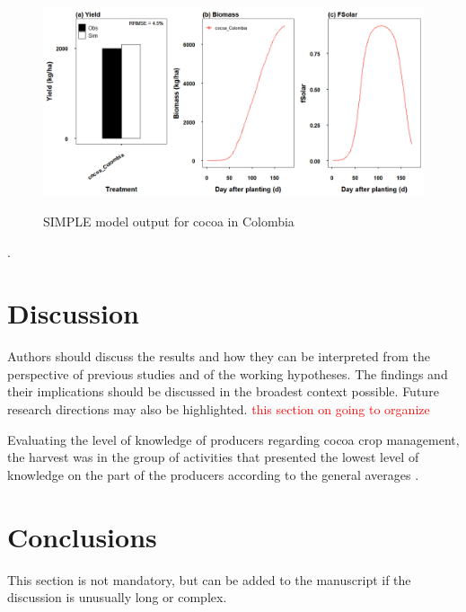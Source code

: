 \documentclass[gene,journal,article,submit,moreauthors,pdftex]{Definitions/mdpi}
\begin{document}
\begin{figure}[h!]
	\centering
	\caption{\footnotesize {SIMPLE model output for cocoa in Colombia }} 
	\includegraphics[scale=0.3]{images/outmodel.png}\\
	\label{fig:m1}
\end{figure}.

\section{Discussion}

Authors should discuss the results and how they can be interpreted from the perspective of previous studies and of the working hypotheses. The findings and their implications should be discussed in the broadest context possible. Future research directions may also be highlighted.
\textcolor{red}{this section on going to organize}

Evaluating the level of knowledge of producers regarding cocoa crop management, the harvest was in the group of activities that presented the lowest level of knowledge on the part of the producers according to the general averages \citep{Gutierrez2020}. 

  

\section{Conclusions}

This section is not mandatory, but can be added to the manuscript if the discussion is unusually long or complex.



\end{document}
